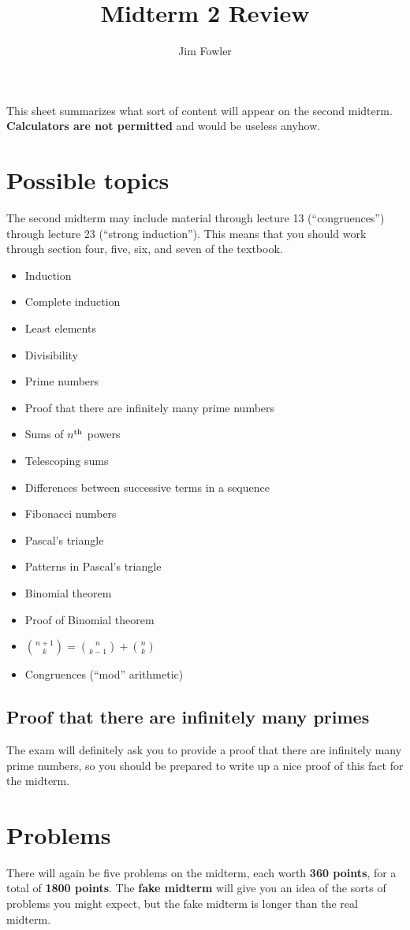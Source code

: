 \documentclass[12pt]{handout}
\title{Midterm 2 Review}
\author{Jim Fowler}
\begin{document}
\maketitle

\noindent This sheet summarizes what sort of content will appear on
the second midterm.  \textbf{Calculators are not permitted} and would be
useless anyhow.

\section*{Possible topics}

The second midterm may include material through lecture 13
(``congruences'') through lecture 23 (``strong induction'').  This
means that you should work through section four, five, six, and seven of the textbook.

\begin{multicols}{2}
\begin{itemize}
\item Induction
\item Complete induction
\item Least elements
\item Divisibility
\item Prime numbers
\item Proof that there are infinitely many prime numbers
\item Sums of $n^{\mbox{\scriptsize th}}$ powers
\item Telescoping sums
\item Differences between successive terms in a sequence
\item Fibonacci numbers
\item Pascal's triangle
\item Patterns in Pascal's triangle
\item Binomial theorem
\item Proof of Binomial theorem
\item $\displaystyle\binom{n+1}{k} = \displaystyle\binom{n}{k-1} + \displaystyle\binom{n}{k}$
\item Congruences (``mod'' arithmetic)
\end{itemize}
\end{multicols}

\subsection*{Proof that there are infinitely many primes}

The exam will definitely ask you to provide a proof that there are
infinitely many prime numbers, so you should be prepared to write up a
nice proof of this fact for the midterm.

\section*{Problems}

There will again be five problems on the midterm, each worth
\textbf{360 points}, for a total of \textbf{1800 points}.  The
\textbf{fake midterm} will give you an idea of the sorts of problems
you might expect, but the fake midterm is longer than the real
midterm.
\end{document}
